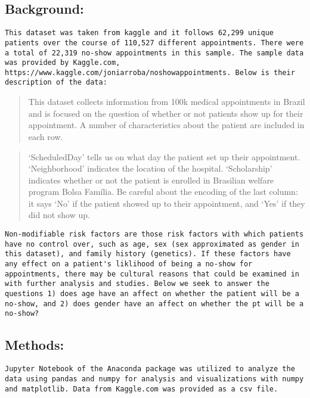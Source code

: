 \documentclass[11pt]{article}
\begin{document}
\subsection{Background:}\label{background}

\begin{verbatim}
This dataset was taken from kaggle and it follows 62,299 unique patients over the course of 110,527 different appointments. There were a total of 22,319 no-show appointments in this sample. The sample data was provided by Kaggle.com, https://www.kaggle.com/joniarroba/noshowappointments. Below is their description of the data:
\end{verbatim}

\begin{quote}
This dataset collects information from 100k medical appointments in
Brazil and is focused on the question of whether or not patients show up
for their appointment. A number of characteristics about the patient are
included in each row.
\end{quote}

\begin{quote}
`ScheduledDay' tells us on what day the patient set up their
appointment. `Neighborhood' indicates the location of the hospital.
`Scholarship' indicates whether or not the patient is enrolled in
Brasilian welfare program Bolsa Família. Be careful about the encoding
of the last column: it says `No' if the patient showed up to their
appointment, and `Yes' if they did not show up.
\end{quote}

\begin{verbatim}
Non-modifiable risk factors are those risk factors with which patients have no control over, such as age, sex (sex approximated as gender in this dataset), and family history (genetics). If these factors have any effect on a patient's liklihood of being a no-show for appointments, there may be cultural reasons that could be examined in with further analysis and studies. Below we seek to answer the questions 1) does age have an affect on whether the patient will be a no-show, and 2) does gender have an affect on whether the pt will be a no-show?
\end{verbatim}

\subsection{Methods:}\label{methods}

\begin{verbatim}
Jupyter Notebook of the Anaconda package was utilized to analyze the data using pandas and numpy for analysis and visualizations with numpy and matplotlib. Data from Kaggle.com was provided as a csv file. 
\end{verbatim}
\end{document}
